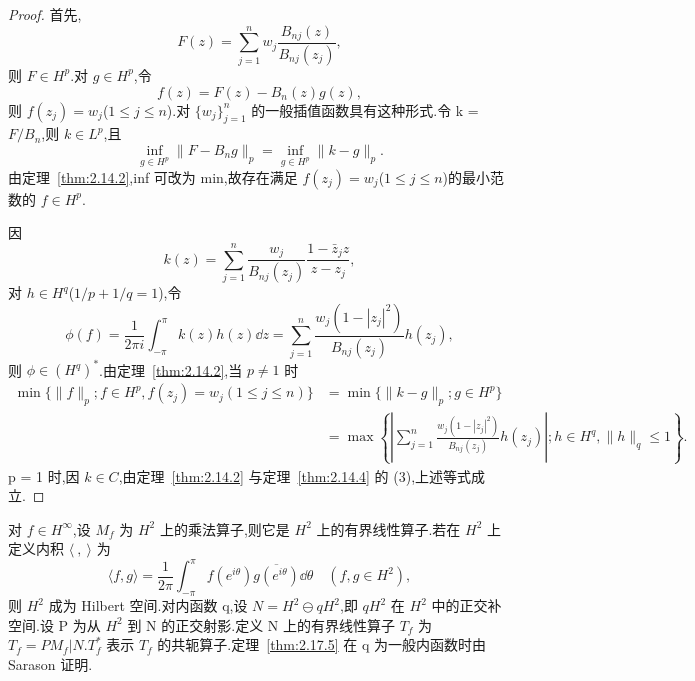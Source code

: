 \begin{proof}
首先,
\begin{equation*}
F(z) = \sum_{j=1}^{n} w_{j}\frac{B_{nj}(z)}{B_{nj}(z_{j})},
\end{equation*}
则 $F \in H^{p}$.对 $g \in H^{p}$,令
\begin{equation*}
f(z) = F(z) - B_{n}(z)g(z),
\end{equation*}
则 $f(z_{j}) = w_{j}$($1 \leq j \leq n$).对 $\{w_{j}\}_{j=1}^{n}$ 的一般插值函数具有这种形式.令 k = $F/B_{n}$,则 $k \in L^{p}$,且
\begin{equation*}
\inf_{g \in H^{p}} \|F - B_{n}g\|_{p} = \inf_{g \in H^{p}} \|k - g\|_{p}.
\end{equation*}
由定理~\ref{thm:2.14.2},inf 可改为 min,故存在满足 $f(z_{j}) = w_{j}$($1 \leq j \leq n$)的最小范数的 $f \in H^{p}$.

因
\begin{equation*}
k(z) = \sum_{j=1}^{n} \frac{w_{j}}{B_{nj}(z_{j})}\frac{1 - \bar{z}_{j}z}{z - z_{j}},
\end{equation*}
对 $h \in H^{q}$($1/p + 1/q = 1$),令
\begin{equation*}
\phi(f) = \frac{1}{2\pi i}\int_{-\pi}^{\pi} k(z) h(z)\dd z = \sum_{j=1}^{n} \frac{w_{j}(1 - |z_{j}|^{2})}{B_{nj}(z_{j})} h(z_{j}),
\end{equation*}
则 $\phi \in (H^{q})^{*}$.由定理~\ref{thm:2.14.2},当 $p \neq 1$ 时
\begin{align*}
\min \{\|f\|_{p}; f \in H^{p}, f(z_{j}) = w_{j} (1 \leq j \leq n)\}&= \min \{\|k - g\|_{p}; g \in H^{p}\}  \\
\quad &= \max \left\{\left| \sum_{j=1}^{n} \frac{w_{j}(1 - |z_{j}|^{2})}{B_{nj}(z_{j})} h(z_{j}) \right|; h \in H^{q}, \|h\|_{q} \leq 1 \right\}.
\end{align*}
p = 1 时,因 $k \in C$,由定理~\ref{thm:2.14.2} 与定理~\ref{thm:2.14.4} 的 (3),上述等式成立.
\end{proof}

对 $f \in H^{\infty}$,设 $M_{f}$ 为 $H^{2}$ 上的乘法算子,则它是 $H^{2}$ 上的有界线性算子.若在 $H^{2}$ 上定义内积 $\langle\ ,\ \rangle$ 为
\begin{equation*}
\langle f, g \rangle = \frac{1}{2\pi}\int_{-\pi}^{\pi} f(e^{i\theta})\overline{g(e^{i\theta})}\dd \theta \quad (f, g \in H^{2}),
\end{equation*}
则 $H^{2}$ 成为 Hilbert 空间.对内函数 q,设 $N = H^{2} \ominus qH^{2}$,即 $qH^{2}$ 在 $H^{2}$ 中的正交补空间.设 P 为从 $H^{2}$ 到 N 的正交射影.定义 N 上的有界线性算子 $T_{f}$ 为 $T_{f} = PM_{f}|N$.$T_{f}^{*}$ 表示 $T_{f}$ 的共轭算子.定理~\ref{thm:2.17.5} 在 q 为一般内函数时由 Sarason \cite{ch2:15} 证明.

